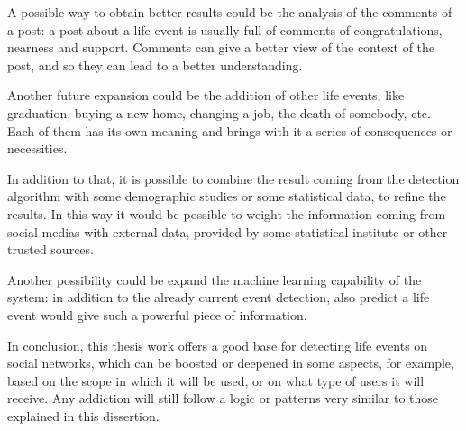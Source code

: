 A possible way to obtain better results could be the analysis of the comments of a post: a post about a life event is usually full of comments of congratulations, nearness and support. Comments can give a better view of the context of the post, and so they can lead to a better understanding.

Another future expansion could be the addition of other life events, like graduation, buying a new home, changing a job, the death of somebody, etc. Each of them has its own meaning and brings with it a series of consequences or necessities.

In addition to that, it is possible to combine the result coming from the detection algorithm with some demographic studies or some statistical data, to refine the results. In this way it would be possible to weight the information coming from social medias with external data, provided by some statistical institute or other trusted sources.

Another possibility could be expand the machine learning capability of the system: in addition to the already current event detection, also predict a life event would give such a powerful piece of information.

In conclusion, this thesis work offers a good base for detecting life events on social networks, which can be boosted or deepened in some aspects, for example, based on the scope in which it will be used, or on what type of users it will receive. Any addiction will still follow a logic or patterns very similar to those explained in this dissertion.